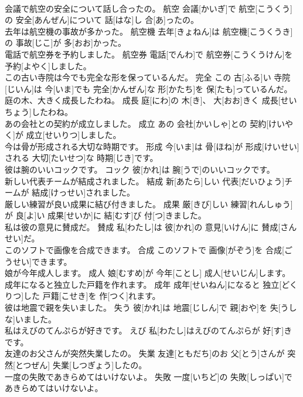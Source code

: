 \documentclass[8pt]{extreport}
\begin{document}
\begin{CJK}{UTF8}{min}
\\	会議で航空の安全について話し合ったの。	航空	会議[かいぎ]で 航空[こうくう]の 安全[あんぜん]について 話[はな]し 合[あ]ったの。	
\\	去年は航空機の事故が多かった。	航空機	去年[きょねん]は 航空機[こうくうき]の 事故[じこ]が 多[おお]かった。	
\\	電話で航空券を予約しました。	航空券	電話[でんわ]で 航空券[こうくうけん]を 予約[よやく]しました。	
\\	この古い寺院は今でも完全な形を保っているんだ。	完全	この 古[ふる]い 寺院[じいん]は 今[いま]でも 完全[かんぜん]な 形[かたち]を 保[たも]っているんだ。	
\\	庭の木、大きく成長したわね。	成長	庭[にわ]の 木[き]、 大[おお]きく 成長[せいちょう]したわね。	
\\	あの会社との契約が成立しました。	成立	あの 会社[かいしゃ]との 契約[けいやく]が 成立[せいりつ]しました。	
\\	今は骨が形成される大切な時期です。	形成	今[いま]は 骨[ほね]が 形成[けいせい]される 大切[たいせつ]な 時期[じき]です。	
\\	彼は腕のいいコックです。	コック	彼[かれ]は 腕[うで]のいいコックです。	
\\	新しい代表チームが結成されました。	結成	新[あたら]しい 代表[だいひょう]チームが 結成[けっせい]されました。	
\\	厳しい練習が良い成果に結び付きました。	成果	厳[きび]しい 練習[れんしゅう]が 良[よ]い 成果[せいか]に 結[むす]び 付[つ]きました。	
\\	私は彼の意見に賛成だ。	賛成	私[わたし]は 彼[かれ]の 意見[いけん]に 賛成[さんせい]だ。	
\\	このソフトで画像を合成できます。	合成	このソフトで 画像[がぞう]を 合成[ごうせい]できます。	
\\	娘が今年成人します。	成人	娘[むすめ]が 今年[ことし] 成人[せいじん]します。	
\\	成年になると独立した戸籍を作れます。	成年	成年[せいねん]になると 独立[どくりつ]した 戸籍[こせき]を 作[つく]れます。	
\\	彼は地震で親を失いました。	失う	彼[かれ]は 地震[じしん]で 親[おや]を 失[うしな]いました。	
\\	私はえびのてんぷらが好きです。	えび	私[わたし]はえびのてんぷらが 好[す]きです。	
\\	友達のお父さんが突然失業したの。	失業	友達[ともだち]のお 父[とう]さんが 突然[とつぜん] 失業[しつぎょう]したの。	
\\	一度の失敗であきらめてはいけないよ。	失敗	一度[いちど]の 失敗[しっぱい]であきらめてはいけないよ。	

\end{CJK}
\end{document}
